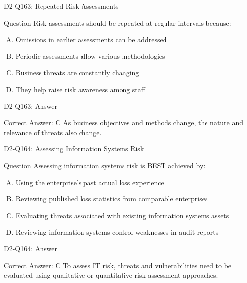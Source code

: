 \documentclass{beamer}
\begin{document}
	\begin{frame}{D2-Q163: Repeated Risk Assessments}
		\begin{block}{Question}
			Risk assessments should be repeated at regular intervals because:
		\end{block}
		\begin{enumerate}[(A)]
			\item Omissions in earlier assessments can be addressed
			\item Periodic assessments allow various methodologies
			\item Business threats are constantly changing
			\item They help raise risk awareness among staff
		\end{enumerate}
	\end{frame}
	\begin{frame}{D2-Q163: Answer}
		\begin{block}{Correct Answer: C}
			As business objectives and methods change, the nature and relevance of threats also change.
		\end{block}
	\end{frame}
	
	\begin{frame}{D2-Q164: Assessing Information Systems Risk}
		\begin{block}{Question}
			Assessing information systems risk is BEST achieved by:
		\end{block}
		\begin{enumerate}[(A)]
			\item Using the enterprise's past actual loss experience
			\item Reviewing published loss statistics from comparable enterprises
			\item Evaluating threats associated with existing information systems assets
			\item Reviewing information systems control weaknesses in audit reports
		\end{enumerate}
	\end{frame}
	\begin{frame}{D2-Q164: Answer}
		\begin{block}{Correct Answer: C}
			To assess IT risk, threats and vulnerabilities need to be evaluated using qualitative or quantitative risk assessment approaches.
		\end{block}
	\end{frame}
	
\end{document}
